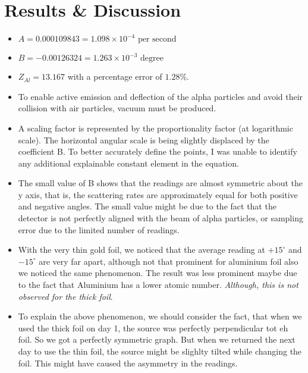 \section{Results \& Discussion}
	\begin{itemize}
		\item $A = 0.000109843 = 1.098\times10^{-4}\text{ per second}$
		\item $B = -0.00126324 = 1.263\times10^{-3}\text{ degree}$
		\item $Z_{Al} = 13.167$ with a percentage error of $1.28\%$.
		\item To enable active emission and deflection of the alpha particles and avoid their collision with air particles, vacuum must be produced.
		\item A scaling factor is represented by the proportionality factor (at logarithmic scale). The horizontal angular scale is being slightly displaced by the coefficient B. To better accurately define the points, I was unable to identify any additional explainable constant element in the equation.
		\item The small value of B shows that the readings are almost symmetric about the y axis, that is, the scattering rates are approximately equal for both positive and negative angles. The small value might be due to the fact that the detector is not perfectly aligned with the beam of alpha particles, or sampling error due to the limited number of readings.
		\item With the very thin gold foil, we noticed that the average reading at $+15^\circ$ and $-15^\circ$ are very far apart, although not that prominent for aluminium foil also we noticed the same phenomenon. The result was less prominent maybe due to the fact that Aluminium has a lower atomic number. \textit{Although, this is not observed for the thick foil}.
		\item To explain the above phenomenon, we should consider the fact, that when we used the thick foil on day 1, the source was perfectly perpendicular tot eh foil. So we got a perfectly symmetric graph. But when we returned the next day to use the thin foil, the source might be slighlty tilted while changing the foil. This might have caused the asymmetry in the readings.
	\end{itemize}